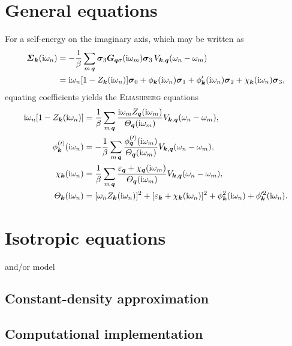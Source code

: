 \section{General equations}

For a self-energy on the imaginary axis, which may be written as
%
\begin{align*}
    \boldsymbol {\varSigma}_{\boldsymbol k}(\mathrm i \omega_n) &= -\frac 1 \beta \sum_{m \, \boldsymbol q}
    \boldsymbol \sigma_3 \boldsymbol G_{\boldsymbol q \sigma}(\mathrm i \omega_m) \boldsymbol \sigma_3 \,
    V_{\boldsymbol k, \boldsymbol q}(\omega_n - \omega_m)
    \\
    &= \mathrm i \omega_n [1 - Z_{\boldsymbol k}(\mathrm i \omega_n)] \boldsymbol \sigma_0
    + \phi_{\boldsymbol k}(\mathrm i \omega_n) \boldsymbol \sigma_1
    + \phi'_{\boldsymbol k}(\mathrm i \omega_n) \boldsymbol \sigma_2
    + \chi_{\boldsymbol k}(\mathrm i \omega_n) \boldsymbol \sigma_3,
\end{align*}
%
equating coefficients yields the \textsc{Eliashberg} equations
%
\begin{align} \label{Eliashberg equations}
    \begin{split}
        \mathrm i \omega_n [1 - Z_{\boldsymbol k}(\mathrm i \omega_n)] &=
        \frac 1 \beta \sum_{m \, \boldsymbol q}
        \frac
            {\mathrm i \omega_m Z_{\boldsymbol q}(\mathrm i \omega_m)}
            {\varTheta_{\boldsymbol q}(\mathrm i \omega_m)}
        V_{\boldsymbol k, \boldsymbol q}(\omega_n - \omega_m),
        \\
        \phi^{(\prime)}_{\boldsymbol k}(\mathrm i \omega_n) &=
        -\frac 1 \beta \sum_{m \, \boldsymbol q}
        \frac
            {\phi^{(\prime)}_{\boldsymbol q}(\mathrm i \omega_m)}
            {\varTheta_{\boldsymbol q}(\mathrm i \omega_m)}
        V_{\boldsymbol k, \boldsymbol q}(\omega_n - \omega_m),
        \\
        \chi_{\boldsymbol k}(\mathrm i \omega_n) &=
        \frac 1 \beta \sum_{m \, \boldsymbol q}
        \frac
            {\varepsilon_{\boldsymbol q} + \chi_{\boldsymbol q}(\mathrm i \omega_m)}
            {\varTheta_{\boldsymbol q}(\mathrm i \omega_m)}
        V_{\boldsymbol k, \boldsymbol q}(\omega_n - \omega_m),
        \\
        \varTheta_{\boldsymbol k}(\mathrm i \omega_n) &=
        [\omega_n Z_{\boldsymbol k}(\mathrm i \omega_n)]^2
        + [\varepsilon_{\boldsymbol k} + \chi_{\boldsymbol k}(\mathrm i \omega_n)]^2
        + \phi_{\boldsymbol k}^2(\mathrm i \omega_n)
        + \phi'^2_{\boldsymbol k}(\mathrm i \omega_n).
    \end{split}
\end{align}

\section{Isotropic equations}

 and/or  model

\subsection{Constant-density approximation}

\subsection{Computational implementation}
